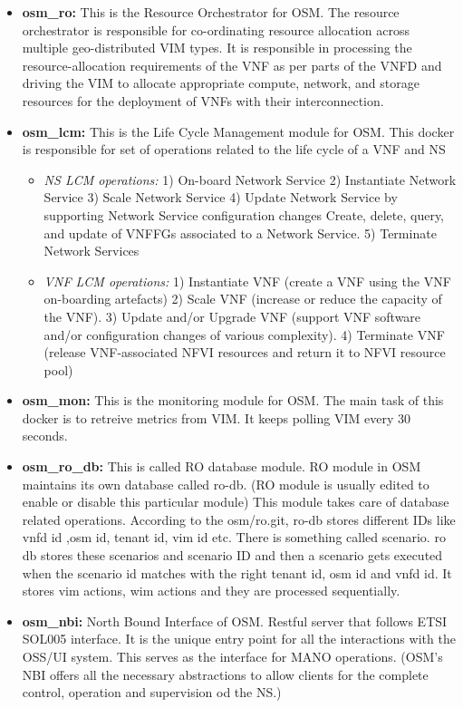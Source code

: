 \begin{itemize}
	\item \textbf{osm\_ro:} This is the Resource Orchestrator for OSM. 
	The resource orchestrator is responsible for co-ordinating resource allocation across multiple geo-distributed VIM types.
	It is responsible in processing the resource-allocation requirements of the VNF as per parts of the VNFD and driving the VIM to allocate appropriate compute, network, and storage resources for the deployment of VNFs with their interconnection. 
	
	\item \textbf{osm\_lcm:} This is the Life Cycle Management module for OSM. 
	This docker is responsible for set of operations related to the life cycle of a VNF and NS
	
	\begin{itemize}
		\item \textit{NS LCM operations:} 
		1) On-board Network Service
		2) Instantiate Network Service
		3) Scale Network Service
		4) Update Network Service by supporting Network Service configuration changes
		Create, delete, query, and update of VNFFGs associated to a Network Service.
		5) Terminate Network Services
		
		\item \textit{VNF LCM operations:} 1) Instantiate VNF (create a VNF using the VNF on-boarding artefacts)
		2) Scale VNF (increase or reduce the capacity of the VNF).
		3) Update and/or Upgrade VNF (support VNF software and/or configuration changes of various complexity).
		4) Terminate VNF (release VNF-associated NFVI resources and return it to NFVI resource pool)
	\end{itemize}
	
	
	
	\item \textbf{osm\_mon:} This is the monitoring module for OSM. 
	The main task of this docker is to retreive metrics from VIM. 
	It keeps polling VIM every 30 seconds. 
	
	\item \textbf{osm\_ro\_db:} This is called RO database module.
	RO module in OSM maintains its own database called ro-db. (RO module is usually edited to enable or disable this particular module)
	This module takes care of database related operations. According to the osm/ro.git, ro-db stores different IDs like vnfd id ,osm id, tenant id, vim id etc. There is something called scenario. ro db stores these scenarios and scenario ID and then a scenario gets executed when the scenario id matches with the right tenant id, osm id and vnfd id. 
	It stores vim actions, wim actions and they are processed sequentially. 
	
	\item \textbf{osm\_nbi:} North Bound Interface of OSM. Restful server that follows ETSI SOL005 interface.
	It is the unique entry point for all the interactions with the OSS/UI system.
	This serves as the interface for MANO operations.
	(OSM's NBI offers all the necessary abstractions to allow clients for the complete control, operation and supervision od the NS.)
\end{itemize}

